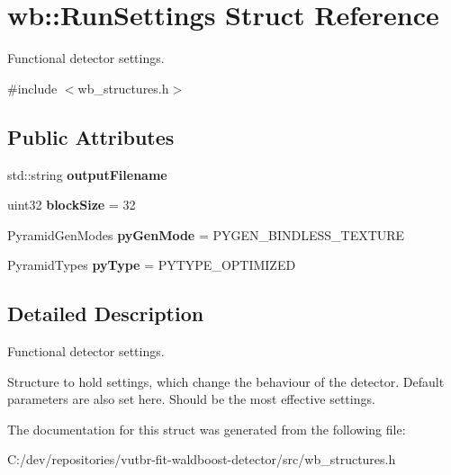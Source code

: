 \hypertarget{structwb_1_1_run_settings}{}\section{wb\+:\+:Run\+Settings Struct Reference}
\label{structwb_1_1_run_settings}


Functional detector settings.  




{\ttfamily \#include $<$wb\+\_\+structures.\+h$>$}

\subsection*{Public Attributes}
\begin{DoxyCompactItemize}
\item 
\hypertarget{structwb_1_1_run_settings_a6a3a2de13aebeac46542a790a0853e58}{}std\+::string {\bfseries output\+Filename}\label{structwb_1_1_run_settings_a6a3a2de13aebeac46542a790a0853e58}

\item 
\hypertarget{structwb_1_1_run_settings_aab8c5e58a1ab10f0d429bde53f504cc7}{}uint32 {\bfseries block\+Size} = 32\label{structwb_1_1_run_settings_aab8c5e58a1ab10f0d429bde53f504cc7}

\item 
\hypertarget{structwb_1_1_run_settings_ac29a30523547343f7239a4394de91092}{}Pyramid\+Gen\+Modes {\bfseries py\+Gen\+Mode} = P\+Y\+G\+E\+N\+\_\+\+B\+I\+N\+D\+L\+E\+S\+S\+\_\+\+T\+E\+X\+T\+U\+R\+E\label{structwb_1_1_run_settings_ac29a30523547343f7239a4394de91092}

\item 
\hypertarget{structwb_1_1_run_settings_acb1261a3407f4e2aebf69984fb22ab12}{}Pyramid\+Types {\bfseries py\+Type} = P\+Y\+T\+Y\+P\+E\+\_\+\+O\+P\+T\+I\+M\+I\+Z\+E\+D\label{structwb_1_1_run_settings_acb1261a3407f4e2aebf69984fb22ab12}

\end{DoxyCompactItemize}


\subsection{Detailed Description}
Functional detector settings. 

Structure to hold settings, which change the behaviour of the detector. Default parameters are also set here. Should be the most effective settings. 

The documentation for this struct was generated from the following file\+:\begin{DoxyCompactItemize}
\item 
C\+:/dev/repositories/vutbr-\/fit-\/waldboost-\/detector/src/wb\+\_\+structures.\+h\end{DoxyCompactItemize}
